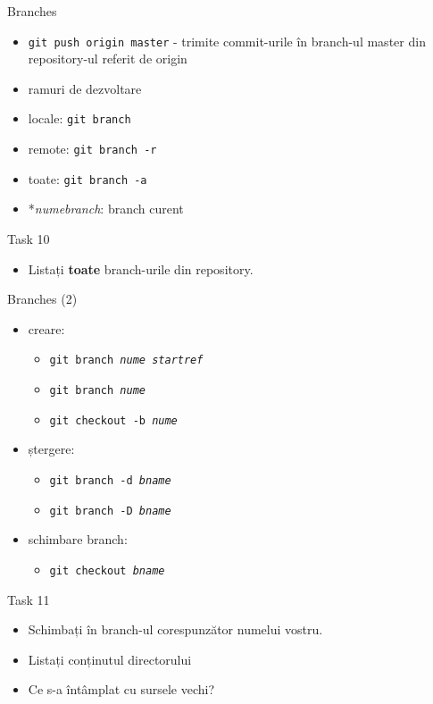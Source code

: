 \documentclass{beamer}
\begin{document}
\begin{frame}{Branches}
  \begin{itemize}[<+->]
    \item \texttt{git push origin master} - trimite commit-urile în branch-ul
    master din repository-ul referit de origin
    \item ramuri de dezvoltare
    \item locale: \texttt{git branch}
    \item remote: \texttt{git branch -r}
    \item toate: \texttt{git branch -a}
    \item *\textit{numebranch}: branch curent
  \end{itemize}
  \pause
  \begin{alertblock}{Task 10}
    \begin{itemize}
      \item Listați \textbf{toate} branch-urile din repository.
    \end{itemize}
  \end{alertblock}
\end{frame}

\begin{frame}{Branches (2)}
  \begin{itemize}
    \item creare:
      \begin{itemize}
        \item \texttt{git branch \textit{nume} \textit{startref}}
        \item \texttt{git branch \textit{nume}}
        \item \texttt{git checkout -b \textit{nume}}
      \end{itemize}
    \pause
    \item ștergere:
      \begin{itemize}
        \item \texttt{git branch -d \textit{bname}}
        \item \texttt{git branch -D \textit{bname}}
      \end{itemize}
    \pause
    \item schimbare branch:
      \begin{itemize}
        \item \texttt{git checkout \textit{bname}}
      \end{itemize}
  \end{itemize}
  \pause
  \begin{alertblock}{Task 11}
    \begin{itemize}
      \item Schimbați în branch-ul corespunzător numelui vostru.
      \item Listați conținutul directorului
      \item Ce s-a întâmplat cu sursele vechi?
    \end{itemize}
  \end{alertblock}
\end{frame}
\end{document}

